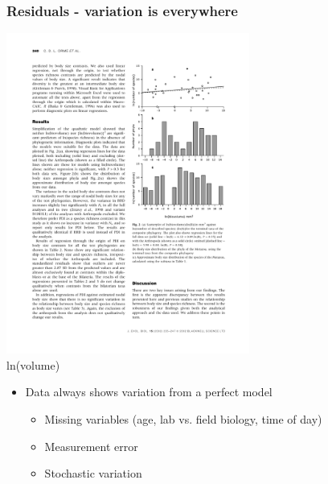 \documentclass[aspectratio=43]{beamer}
\begin{document}
\frame
{\frametitle{Residuals - variation is everywhere}

\begin{center}
		\includegraphics[width=0.6\textwidth]{VariationOrme2002.pdf}\\
		{\tiny ln(volume)}
\end{center}		
		
\begin{itemize}
\item Data always shows variation from a perfect model
\begin{itemize}
\item Missing variables (age, lab vs. field biology, time of day) 
\item Measurement error 
\item Stochastic variation
\end{itemize}
\end{itemize}
}
\end{document}
